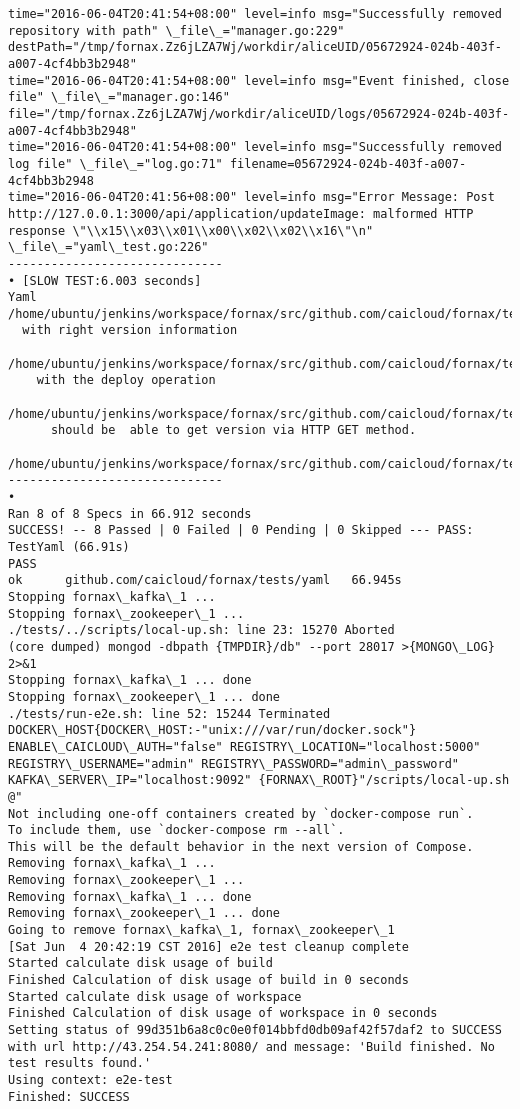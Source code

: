 \begin{lstlisting}[caption={Fornax功能性测试日志}]
time="2016-06-04T20:41:54+08:00" level=info msg="Successfully removed repository with path" \_file\_="manager.go:229" destPath="/tmp/fornax.Zz6jLZA7Wj/workdir/aliceUID/05672924-024b-403f-a007-4cf4bb3b2948" 
time="2016-06-04T20:41:54+08:00" level=info msg="Event finished, close file" \_file\_="manager.go:146" file="/tmp/fornax.Zz6jLZA7Wj/workdir/aliceUID/logs/05672924-024b-403f-a007-4cf4bb3b2948" 
time="2016-06-04T20:41:54+08:00" level=info msg="Successfully removed log file" \_file\_="log.go:71" filename=05672924-024b-403f-a007-4cf4bb3b2948 
time="2016-06-04T20:41:56+08:00" level=info msg="Error Message: Post http://127.0.0.1:3000/api/application/updateImage: malformed HTTP response \"\\x15\\x03\\x01\\x00\\x02\\x02\\x16\"\n" \_file\_="yaml\_test.go:226" 
------------------------------
• [SLOW TEST:6.003 seconds]
Yaml
/home/ubuntu/jenkins/workspace/fornax/src/github.com/caicloud/fornax/tests/yaml/yaml\_test.go:243
  with right version information
  /home/ubuntu/jenkins/workspace/fornax/src/github.com/caicloud/fornax/tests/yaml/yaml\_test.go:242
    with the deploy operation
    /home/ubuntu/jenkins/workspace/fornax/src/github.com/caicloud/fornax/tests/yaml/yaml\_test.go:240
      should be  able to get version via HTTP GET method.
      /home/ubuntu/jenkins/workspace/fornax/src/github.com/caicloud/fornax/tests/yaml/yaml\_test.go:228
------------------------------
•
Ran 8 of 8 Specs in 66.912 seconds
SUCCESS! -- 8 Passed | 0 Failed | 0 Pending | 0 Skipped --- PASS: TestYaml (66.91s)
PASS
ok  	github.com/caicloud/fornax/tests/yaml	66.945s
Stopping fornax\_kafka\_1 ... 
Stopping fornax\_zookeeper\_1 ... 
./tests/../scripts/local-up.sh: line 23: 15270 Aborted                 (core dumped) mongod -dbpath {TMPDIR}/db" --port 28017 >{MONGO\_LOG} 2>&1
Stopping fornax\_kafka\_1 ... done
Stopping fornax\_zookeeper\_1 ... done
./tests/run-e2e.sh: line 52: 15244 Terminated              DOCKER\_HOST{DOCKER\_HOST:-"unix:///var/run/docker.sock"} ENABLE\_CAICLOUD\_AUTH="false" REGISTRY\_LOCATION="localhost:5000" REGISTRY\_USERNAME="admin" REGISTRY\_PASSWORD="admin\_password" KAFKA\_SERVER\_IP="localhost:9092" {FORNAX\_ROOT}"/scripts/local-up.sh @"
Not including one-off containers created by `docker-compose run`.
To include them, use `docker-compose rm --all`.
This will be the default behavior in the next version of Compose.
Removing fornax\_kafka\_1 ... 
Removing fornax\_zookeeper\_1 ... 
Removing fornax\_kafka\_1 ... done
Removing fornax\_zookeeper\_1 ... done
Going to remove fornax\_kafka\_1, fornax\_zookeeper\_1
[Sat Jun  4 20:42:19 CST 2016] e2e test cleanup complete
Started calculate disk usage of build
Finished Calculation of disk usage of build in 0 seconds
Started calculate disk usage of workspace
Finished Calculation of disk usage of workspace in 0 seconds
Setting status of 99d351b6a8c0c0e0f014bbfd0db09af42f57daf2 to SUCCESS with url http://43.254.54.241:8080/ and message: 'Build finished. No test results found.'
Using context: e2e-test
Finished: SUCCESS
\end{lstlisting}